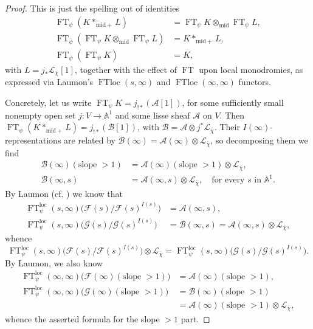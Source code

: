 \begin{proof}
This is just the spelling out of identities
\[
\begin{aligned}
  \operatorname{FT}_{\psi}(K*_{\mathrm{mid}+}L)
  &=
  \operatorname{FT}_{\psi}K\otimes_{\mathrm{mid}}\operatorname{FT}_{\psi}L,\\
  \operatorname{FT}_{\overline{\psi}}
  (\operatorname{FT}_{\psi}K\otimes_{\mathrm{mid}}\operatorname{FT}_{\psi}L)
  &=
  K*_{\mathrm{mid}+}L,\\
  \operatorname{FT}_{\overline{\psi}}(\operatorname{FT}_{\psi}K)&=K,
\end{aligned}
\]
with \(L=j_*\mathcal{L}_{\chi}[1]\), together with the effect of
\(\operatorname{FT}\) upon local monodromies, as expressed via Laumon's
\(\operatorname{FTloc}(s,\infty)\) and \(\operatorname{FTloc}(\infty,\infty)\)
functors.

Concretely, let us write
\(\operatorname{FT}_{\psi}K=j_{!*}(\mathcal{A}[1])\), for some sufficiently
small nonempty open set \(j:V\to\mathbb{A}^1\) and some lisse sheaf
\(\mathcal{A}\) on \(V\). Then
\(\operatorname{FT}_{\psi}(K*_{\mathrm{mid}+}L)=j_{!*}(\mathcal{B}[1])\), with
\(\mathcal{B}=\mathcal{A}\otimes j^*\mathcal{L}_{\overline{\chi}}\). Their
\(I(\infty)\)-representations are related by
\(\mathcal{B}(\infty)=\mathcal{A}(\infty)\otimes\mathcal{L}_{\overline{\chi}}\),
so decomposing them we find
\[
\begin{aligned}
  \mathcal{B}(\infty)(\text{slope }>1)
  &=
  \mathcal{A}(\infty)(\text{slope }>1)\otimes
  \mathcal{L}_{\overline{\chi}},\\
  \mathcal{B}(\infty,s)
  &=
  \mathcal{A}(\infty,s)\otimes\mathcal{L}_{\overline{\chi}},
  \quad\text{for every }s\text{ in }\mathbb{A}^1.
\end{aligned}
\]
By Laumon (cf. \cite[7.4.2]{Ka-ESDE}) we know that
\[
\begin{aligned}
  \operatorname{FT}_{\psi}^{\mathrm{loc}}(s,\infty)
  \bigl(\mathcal{F}(s)/\mathcal{F}(s)^{I(s)}\bigr)
  &=
  \mathcal{A}(\infty,s),\\
  \operatorname{FT}_{\psi}^{\mathrm{loc}}(s,\infty)
  \bigl(\mathcal{G}(s)/\mathcal{G}(s)^{I(s)}\bigr)
  &=
  \mathcal{B}(\infty,s)
  =
  \mathcal{A}(\infty,s)\otimes\mathcal{L}_{\overline{\chi}},
\end{aligned}
\]
whence
\[
  \operatorname{FT}_{\psi}^{\mathrm{loc}}(s,\infty)
  \bigl(\mathcal{F}(s)/\mathcal{F}(s)^{I(s)}\bigr)
  \otimes\mathcal{L}_{\overline{\chi}}
  =
  \operatorname{FT}_{\psi}^{\mathrm{loc}}(s,\infty)
  \bigl(\mathcal{G}(s)/\mathcal{G}(s)^{I(s)}\bigr).
\]
By Laumon, we also know
\[
\begin{aligned}
  \operatorname{FT}_{\psi}^{\mathrm{loc}}(\infty,\infty)
  \bigl(\mathcal{F}(\infty)(\text{slope }>1)\bigr)
  &=
  \mathcal{A}(\infty)(\text{slope }>1),\\
  \operatorname{FT}_{\psi}^{\mathrm{loc}}(\infty,\infty)
  \bigl(\mathcal{G}(\infty)(\text{slope }>1)\bigr)
  &=
  \mathcal{B}(\infty)(\text{slope }>1)\\
  &=
  \mathcal{A}(\infty)(\text{slope }>1)\otimes
  \mathcal{L}_{\overline{\chi}},
\end{aligned}
\]
whence the asserted formula for the slope \(>1\) part.


\end{proof}
